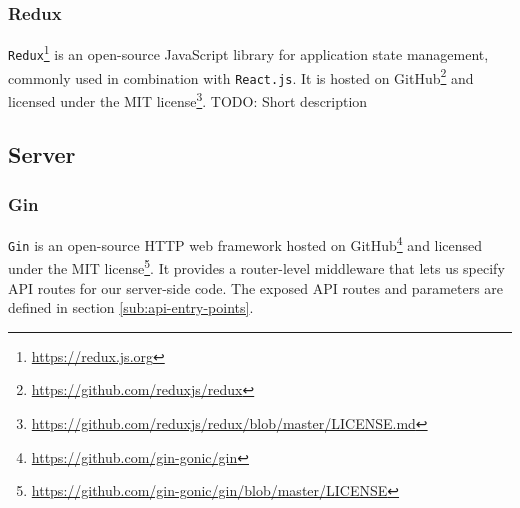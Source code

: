 \subsubsection{Redux}
\texttt{Redux}\footnote{\url{https://redux.js.org}} is an open-source JavaScript library for application state management, commonly used in combination with \texttt{React.js}.
It is hosted on GitHub\footnote{\url{https://github.com/reduxjs/redux}} and licensed under the MIT license\footnote{\url{https://github.com/reduxjs/redux/blob/master/LICENSE.md}}.
TODO: Short description 

\subsection{Server}

\subsubsection{Gin}
\texttt{Gin} is an open-source HTTP web framework hosted on GitHub\footnote{\url{https://github.com/gin-gonic/gin}} and licensed under the MIT license\footnote{\url{https://github.com/gin-gonic/gin/blob/master/LICENSE}}.
It provides a router-level middleware that lets us specify API routes for our server-side code. The exposed API routes and parameters are defined in section \ref{sub:api-entry-points}.




